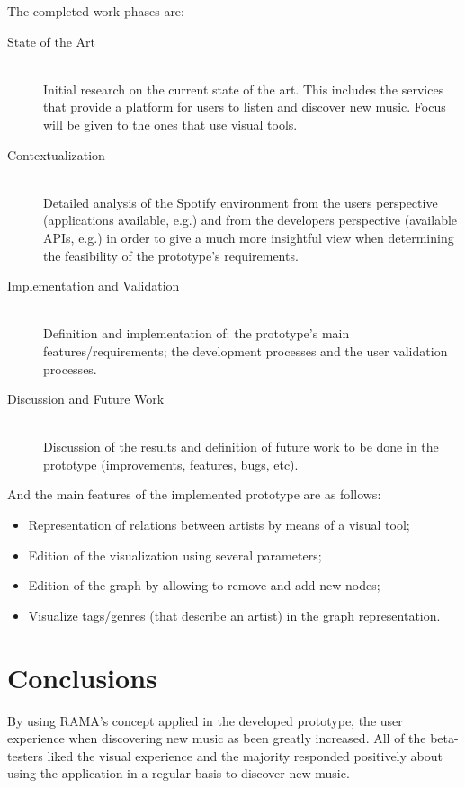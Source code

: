 \documentclass[twocolumn]{article}
\begin{document}
  The completed work phases are:

  \begin{description}
    \item[State of the Art] \hfill \\
      Initial research on the current state of the art. 
      This includes the services that provide a platform for users to listen and discover new music. 
      Focus will be given to the ones that use visual tools.
    \item[Contextualization] \hfill \\
      Detailed analysis of the Spotify environment from the users perspective (applications available, e.g.) and from the developers perspective (available APIs, e.g.) in order to give a much more insightful view when determining the feasibility of the prototype's requirements.
    \item[Implementation and Validation] \hfill \\
      Definition and implementation of: the prototype's main features/requirements; the development processes and the user validation processes.
    \item[Discussion and Future Work] \hfill \\
      Discussion of the results and definition of future work to be done in the prototype (improvements, features, bugs, etc).
  \end{description}

  And the main features of the implemented prototype are as follows:

  \begin{itemize}
    \item Representation of relations between artists by means of a visual tool;
    \item Edition of the visualization using several parameters;
    \item Edition of the graph by allowing to remove and add new nodes;
    \item Visualize tags/genres (that describe an artist) in the graph representation.
  \end{itemize}


\section{Conclusions}
\label{sec:conclusions}

  By using RAMA's concept applied in the developed prototype, the user experience when discovering new music as been greatly increased.
  All of the beta-testers liked the visual experience and the majority responded positively about using the application in a regular basis to discover new music.



\end{document}

